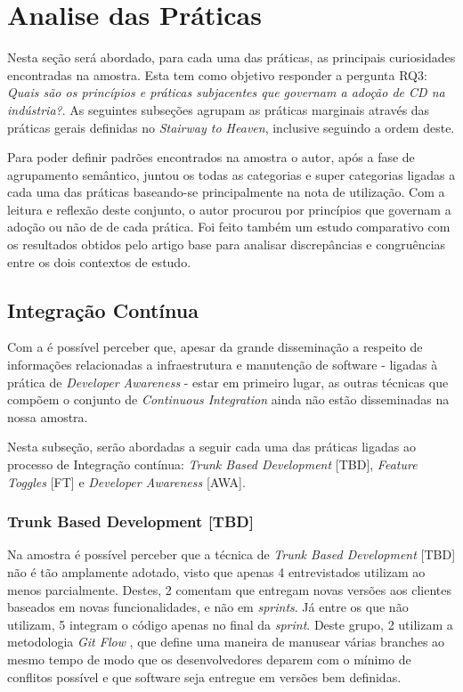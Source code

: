 \section{Analise das Práticas}

Nesta seção será abordado, para cada uma das práticas, as principais curiosidades encontradas na amostra. Esta tem como objetivo responder a pergunta RQ3: \emph{Quais são os princípios e práticas subjacentes que governam a adoção de CD na indústria?}. As seguintes subseções agrupam as práticas marginais através das práticas gerais definidas no \emph{Stairway to Heaven}, inclusive seguindo a ordem deste.

Para poder definir padrões encontrados na amostra o autor, após a fase de agrupamento semântico, juntou os todas as categorias e super categorias ligadas a cada uma das práticas baseando-se principalmente na nota de utilização. Com a leitura e reflexão deste conjunto, o autor procurou por princípios que governam a adoção ou não de de cada prática. Foi feito também um estudo comparativo com os resultados obtidos pelo artigo base \cite{empiricalStudy2016} para analisar discrepâncias e congruências entre os dois contextos de estudo.

\subsection{Integração Contínua}

Com a  é possível perceber que, apesar da grande disseminação a respeito de informações relacionadas a infraestrutura e manutenção de software - ligadas à prática de \emph{Developer Awareness} - estar em primeiro lugar, as outras técnicas que compõem o conjunto de \emph{Continuous Integration} ainda não estão disseminadas na nossa amostra.

Nesta subseção, serão abordadas a seguir cada uma das práticas ligadas ao processo de Integração contínua: \emph{Trunk Based Development} [TBD], \emph{Feature Toggles} [FT] e \emph{Developer Awareness} [AWA].


\subsubsection{Trunk Based Development [TBD]}
Na amostra é possível perceber que a técnica de \emph{Trunk Based Development} [TBD] não é tão amplamente adotado, visto que apenas 4 entrevistados utilizam ao menos parcialmente. Destes, 2 comentam que entregam novas versões aos clientes baseados em novas funcionalidades, e não em \emph{sprints}. Já entre os que não utilizam, 5 integram o código apenas no final da \emph{sprint}. Deste grupo, 2 utilizam a metodologia \emph{Git Flow} \cite{gitFlow}, que define uma maneira de manusear várias branches ao mesmo tempo de modo que os desenvolvedores deparem com o mínimo de conflitos possível e que software seja entregue em versões bem definidas.

